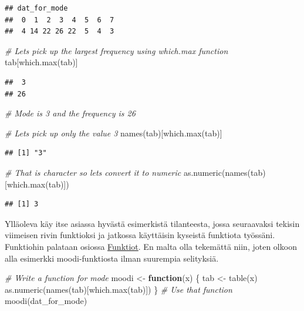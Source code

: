 \documentclass[
]{book}
\newenvironment{Shaded}{\begin{snugshade}}{\end{snugshade}}
\newcommand{\CommentTok}[1]{\textcolor[rgb]{0.56,0.35,0.01}{\textit{#1}}}
\newcommand{\ControlFlowTok}[1]{\textcolor[rgb]{0.13,0.29,0.53}{\textbf{#1}}}
\newcommand{\FunctionTok}[1]{\textcolor[rgb]{0.00,0.00,0.00}{#1}}
\newcommand{\NormalTok}[1]{#1}
\newcommand{\OtherTok}[1]{\textcolor[rgb]{0.56,0.35,0.01}{#1}}
\begin{document}
\begin{verbatim}
## dat_for_mode
##  0  1  2  3  4  5  6  7 
##  4 14 22 26 22  5  4  3
\end{verbatim}

\begin{Shaded}
\begin{Highlighting}[]
\CommentTok{\# Let\textquotesingle{}s pick up the largest frequency using which.max function}
\NormalTok{tab[}\FunctionTok{which.max}\NormalTok{(tab)]}
\end{Highlighting}
\end{Shaded}

\begin{verbatim}
##  3 
## 26
\end{verbatim}

\begin{Shaded}
\begin{Highlighting}[]
\CommentTok{\# Mode is 3 and the frequency is 26}

\CommentTok{\# Let\textquotesingle{}s pick up only the value 3}
\FunctionTok{names}\NormalTok{(tab)[}\FunctionTok{which.max}\NormalTok{(tab)]}
\end{Highlighting}
\end{Shaded}

\begin{verbatim}
## [1] "3"
\end{verbatim}

\begin{Shaded}
\begin{Highlighting}[]
\CommentTok{\# That is character so let\textquotesingle{}s convert it to numeric}
\FunctionTok{as.numeric}\NormalTok{(}\FunctionTok{names}\NormalTok{(tab)[}\FunctionTok{which.max}\NormalTok{(tab)])}
\end{Highlighting}
\end{Shaded}

\begin{verbatim}
## [1] 3
\end{verbatim}

Ylläoleva käy itse asiassa hyvästä esimerkistä tilanteesta, jossa seuraavaksi tekisin viimeisen rivin funktioksi ja jatkossa käyttäisin kyseistä funktiota työssäni. Funktiohin palataan osiossa \protect\hyperlink{functions}{Funktiot}. En malta olla tekemättä niin, joten olkoon alla esimerkki moodi-funktiosta ilman suurempia selityksiä.

\begin{Shaded}
\begin{Highlighting}[]
\CommentTok{\# Write a function for mode}
\NormalTok{moodi }\OtherTok{\textless{}{-}} \ControlFlowTok{function}\NormalTok{(x) \{}
\NormalTok{  tab }\OtherTok{\textless{}{-}} \FunctionTok{table}\NormalTok{(x)}
  \FunctionTok{as.numeric}\NormalTok{(}\FunctionTok{names}\NormalTok{(tab)[}\FunctionTok{which.max}\NormalTok{(tab)])}
\NormalTok{\}}
\CommentTok{\# Use that function}
\FunctionTok{moodi}\NormalTok{(dat\_for\_mode)}
\end{Highlighting}
\end{Shaded}
\end{document}
